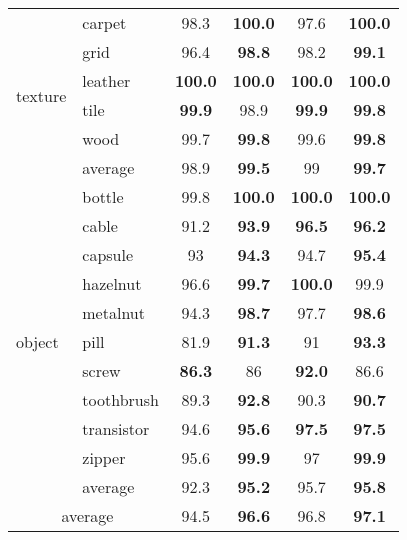 \documentclass[final]{cvpr}
\begin{document}
\begin{table}[t]
{\begin{tabular}{l|l|c|c||c|c}
\midrule
\multirow{6}{*}{texture}    &   carpet  &   98.3    &   {\bf100.0}\scriptsize{}  &   97.6    &   {\bf100.0}\scriptsize{}\\    
    &   grid    &   96.4    &   {\bf98.8}\scriptsize{}  &   98.2    &   {\bf99.1}\scriptsize{}\\    
    &   leather &   {\bf100.0}  &   {\bf100.0}\scriptsize{}  &   {\bf100.0}  &   {\bf100.0}\scriptsize{}\\    
    &   tile    &   {\bf99.9}   &   98.9\scriptsize{}  &   {\bf99.9}   &   {\bf99.8}\scriptsize{}\\    
    &   wood    &   99.7    &   {\bf99.8}\scriptsize{}  &   99.6    &   {\bf99.8}\scriptsize{}\\    \cmidrule{2-6}
    &   average &   98.9    &   {\bf99.5}\scriptsize{}  &   99  &   {\bf99.7}\scriptsize{}\\    \midrule
\multirow{11}{*}{object}    &   bottle  &   99.8    &   {\bf100.0}\scriptsize{}  &   {\bf100.0}  &   {\bf100.0}\scriptsize{}\\    
    &   cable   &   91.2    &   {\bf93.9}\scriptsize{}  &   {\bf96.5}   &   {\bf96.2}\scriptsize{}\\    
    &   capsule &   93  &   {\bf94.3}\scriptsize{}  &   94.7    &   {\bf95.4}\scriptsize{}\\    
    &   hazelnut    &   96.6    &   {\bf99.7}\scriptsize{}  &   {\bf100.0}  &   99.9\scriptsize{}\\    
    &   metalnut    &   94.3    &   {\bf98.7}\scriptsize{}  &   97.7    &   {\bf98.6}\scriptsize{}\\    
    &   pill    &   81.9    &   {\bf91.3}\scriptsize{}  &   91  &   {\bf93.3}\scriptsize{}\\    
    &   screw   &   {\bf86.3}   &   86\scriptsize{}  &   {\bf92.0}   &   86.6\scriptsize{}\\    
    &   toothbrush  &   89.3    &   {\bf92.8}\scriptsize{}  &   90.3    &   {\bf90.7}\scriptsize{}\\    
    &   transistor  &   94.6    &   {\bf95.6}\scriptsize{}  &   {\bf97.5}   &   {\bf97.5}\scriptsize{}\\    
    &   zipper  &   95.6    &   {\bf99.9}\scriptsize{}  &   97  &   {\bf99.9}\scriptsize{}\\    \cmidrule{2-6}
    &   average &   92.3    &   {\bf95.2}\scriptsize{}  &   95.7    &   {\bf95.8}\scriptsize{}\\    \midrule
        \multicolumn{2}{c|}{average}    &   94.5    &   {\bf96.6}\scriptsize{}  &   96.8    &   {\bf97.1}\scriptsize{}\\    \bottomrule
    \end{tabular}
    }
    \vspace{-0.1in}
\end{table}
\end{document}
